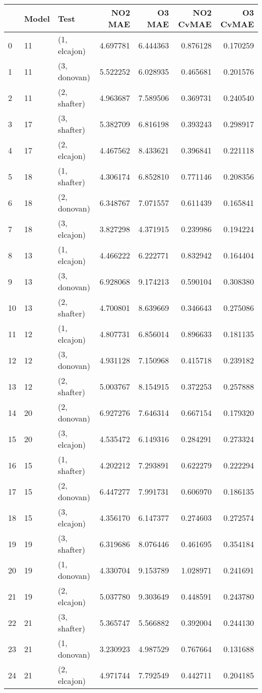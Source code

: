 \begin{tabular}{lllrrrr}
\toprule
{} & Model &          Test &   NO2 MAE &    O3 MAE &  NO2 CvMAE &  O3 CvMAE \\
\midrule
0  &    11 &  (1, elcajon) &  4.697781 &  6.444363 &   0.876128 &  0.170259 \\
1  &    11 &  (3, donovan) &  5.522252 &  6.028935 &   0.465681 &  0.201576 \\
2  &    11 &  (2, shafter) &  4.963687 &  7.589506 &   0.369731 &  0.240540 \\
3  &    17 &  (3, shafter) &  5.382709 &  6.816198 &   0.393243 &  0.298917 \\
4  &    17 &  (2, elcajon) &  4.467562 &  8.433621 &   0.396841 &  0.221118 \\
5  &    18 &  (1, shafter) &  4.306174 &  6.852810 &   0.771146 &  0.208356 \\
6  &    18 &  (2, donovan) &  6.348767 &  7.071557 &   0.611439 &  0.165841 \\
7  &    18 &  (3, elcajon) &  3.827298 &  4.371915 &   0.239986 &  0.194224 \\
8  &    13 &  (1, elcajon) &  4.466222 &  6.222771 &   0.832942 &  0.164404 \\
9  &    13 &  (3, donovan) &  6.928068 &  9.174213 &   0.590104 &  0.308380 \\
10 &    13 &  (2, shafter) &  4.700801 &  8.639669 &   0.346643 &  0.275086 \\
11 &    12 &  (1, elcajon) &  4.807731 &  6.856014 &   0.896633 &  0.181135 \\
12 &    12 &  (3, donovan) &  4.931128 &  7.150968 &   0.415718 &  0.239182 \\
13 &    12 &  (2, shafter) &  5.003767 &  8.154915 &   0.372253 &  0.257888 \\
14 &    20 &  (2, donovan) &  6.927276 &  7.646314 &   0.667154 &  0.179320 \\
15 &    20 &  (3, elcajon) &  4.535472 &  6.149316 &   0.284291 &  0.273324 \\
16 &    15 &  (1, shafter) &  4.202212 &  7.293891 &   0.622279 &  0.222294 \\
17 &    15 &  (2, donovan) &  6.447277 &  7.991731 &   0.606970 &  0.186135 \\
18 &    15 &  (3, elcajon) &  4.356170 &  6.147377 &   0.274603 &  0.272574 \\
19 &    19 &  (3, shafter) &  6.319686 &  8.076446 &   0.461695 &  0.354184 \\
20 &    19 &  (1, donovan) &  4.330704 &  9.153789 &   1.028971 &  0.241691 \\
21 &    19 &  (2, elcajon) &  5.037780 &  9.303649 &   0.448591 &  0.243780 \\
22 &    21 &  (3, shafter) &  5.365747 &  5.566882 &   0.392004 &  0.244130 \\
23 &    21 &  (1, donovan) &  3.230923 &  4.987529 &   0.767664 &  0.131688 \\
24 &    21 &  (2, elcajon) &  4.971744 &  7.792549 &   0.442711 &  0.204185 \\
\bottomrule
\end{tabular}
